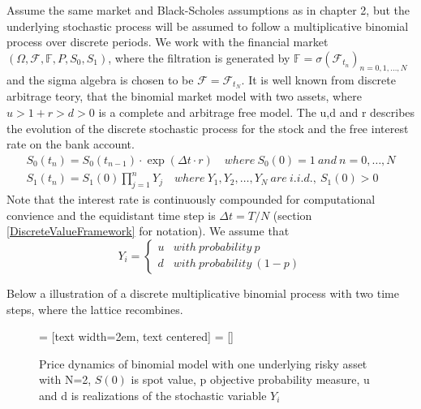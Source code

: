 Assume the same market and Black-Scholes assumptions as in chapter 2, but the underlying stochastic process will be assumed to follow a multiplicative binomial process over discrete periods. We work with the financial market $(\Omega, \mathcal{F}, \mathbb{F}, P, S_0, S_1)$, where the filtration is generated by $\mathbb{F}= \sigma(\mathcal{F}_{t_n})_{n=0,1,\ldots, N}$ and the sigma algebra is chosen to be $\mathcal{F}=\mathcal{F}_{t_{N}}$. It is well known from discrete arbitrage teory, that the binomial market model with two assets, where $u>1+r>d>0$ is a complete and arbitrage free model. The u,d and r describes the evolution of the discrete stochastic process for the stock and the free interest rate on the bank account. 
\begin{align*}
S_{0}(t_n)=S_{0}(t_{n-1}) \cdot \exp(\Delta t \cdot r) \quad where \ S_{0}(0)=1 \ and \ n=0, \ldots, N\\
S_{1}(t_n)=S_{1}(0)\prod_{j=1}^{n} Y_{j} \quad where \ Y_1,Y_2, \ldots, Y_N \ are \ i.i.d., \ S_1(0)>0
\end{align*}
Note that the interest rate is continuously compounded for computational convience and the equidistant time step is $\Delta t=T/N$ (section \ref{DiscreteValueFramework} for notation). We assume that \[ Y_i = \begin{cases} 
      u & with \ probability \ p \\
      d & with \ probability \ (1-p)
   \end{cases}
\]

Below a illustration of a discrete multiplicative binomial process with two time steps, where the lattice recombines.

\begin{figure}[H]
\centering
 = [text width=2em, text centered]
 = []
\decoRule
\caption[Two Dimensionel Binomial Lattice]{Price dynamics of binomial model with one underlying risky asset with N=2, $S(0)$ is spot value, p objective probability measure, u and d is realizations of the stochastic variable $Y_i$}
\label{fig:twoDimLattice}
\end{figure}

